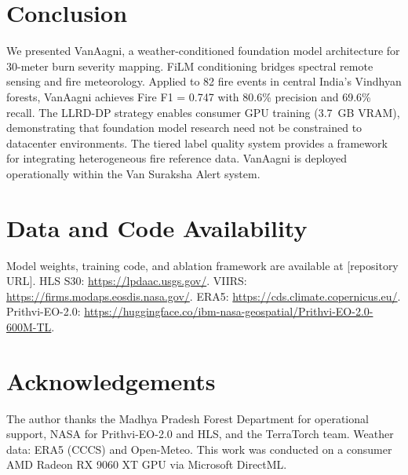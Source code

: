 \documentclass[review,12pt]{elsarticle}
\begin{document}
\section{Conclusion}
\label{sec:conclusion}

We presented VanAagni, a weather-conditioned foundation model architecture for 30-meter burn severity mapping. FiLM conditioning bridges spectral remote sensing and fire meteorology. Applied to 82 fire events in central India's Vindhyan forests, VanAagni achieves Fire F1 = 0.747 with 80.6\% precision and 69.6\% recall. The LLRD-DP strategy enables consumer GPU training (3.7~GB VRAM), demonstrating that foundation model research need not be constrained to datacenter environments. The tiered label quality system provides a framework for integrating heterogeneous fire reference data. VanAagni is deployed operationally within the Van Suraksha Alert system.


\section*{Data and Code Availability}

Model weights, training code, and ablation framework are available at [repository URL]. HLS S30: \url{https://lpdaac.usgs.gov/}. VIIRS: \url{https://firms.modaps.eosdis.nasa.gov/}. ERA5: \url{https://cds.climate.copernicus.eu/}. Prithvi-EO-2.0: \url{https://huggingface.co/ibm-nasa-geospatial/Prithvi-EO-2.0-600M-TL}.


\section*{Acknowledgements}

The author thanks the Madhya Pradesh Forest Department for operational support, NASA for Prithvi-EO-2.0 and HLS, and the TerraTorch team. Weather data: ERA5 (CCCS) and Open-Meteo. This work was conducted on a consumer AMD Radeon RX 9060 XT GPU via Microsoft DirectML.


\end{document}
